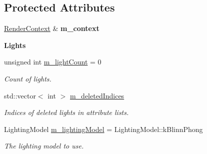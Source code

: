 \subsection*{Protected Attributes}
\begin{DoxyCompactItemize}
\item 
\mbox{\label{classrev_1_1_lighting_settings_a98b65a2c66476ac638abdab07c8b344d}} 
\mbox{\hyperlink{classrev_1_1_render_context}{Render\+Context}} \& {\bfseries m\+\_\+context}
\end{DoxyCompactItemize}
\begin{Indent}\textbf{ Lights}\par
\begin{DoxyCompactItemize}
\item 
\mbox{\label{classrev_1_1_lighting_settings_a8b4e94ac35edfed0ad1b69ed576e5c5a}} 
unsigned int \mbox{\hyperlink{classrev_1_1_lighting_settings_a8b4e94ac35edfed0ad1b69ed576e5c5a}{m\+\_\+light\+Count}} = 0
\begin{DoxyCompactList}\small\item\em Count of lights. \end{DoxyCompactList}\item 
\mbox{\label{classrev_1_1_lighting_settings_add3c187e92cadd47241ad7433411bb28}} 
std\+::vector$<$ int $>$ \mbox{\hyperlink{classrev_1_1_lighting_settings_add3c187e92cadd47241ad7433411bb28}{m\+\_\+deleted\+Indices}}
\begin{DoxyCompactList}\small\item\em Indices of deleted lights in attribute lists. \end{DoxyCompactList}\item 
\mbox{\label{classrev_1_1_lighting_settings_aa32b8e7e0571867210245f9acc59febc}} 
Lighting\+Model \mbox{\hyperlink{classrev_1_1_lighting_settings_aa32b8e7e0571867210245f9acc59febc}{m\+\_\+lighting\+Model}} = Lighting\+Model\+::k\+Blinn\+Phong
\begin{DoxyCompactList}\small\item\em The lighting model to use. \end{DoxyCompactList}\item 
\mbox{\label{classrev_1_1_lighting_settings_a1b31def0acbff323d96c228206c8c29e}} 

\end{DoxyCompactItemize}
\end{Indent}
